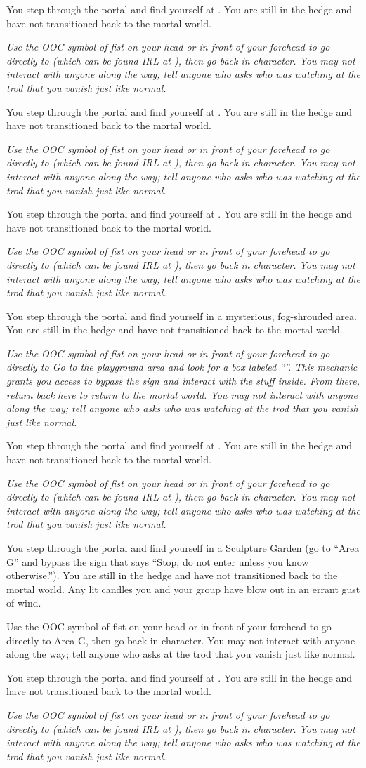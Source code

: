 \documentclass[white]{gl2018}
\begin{document}
\newcommand{\jumpto}[1]{You step through the portal and find yourself at #1{}. You are still in the hedge and have not transitioned back to the mortal world.

\textit{Use the OOC symbol of fist on your head or in front of your forehead to go directly to #1{} (which can be found IRL at #1{\MYwhere}), then go back in character. You may not interact with anyone along the way; tell anyone who asks who was watching at the trod that you vanish just like normal.}}
\begin{sect}{2}
\jumpto{\pAlbinoRedwoodWeekend}
\end{sect}
\begin{sect}{3}
\jumpto{\pReflectingPoolWeekend}
\end{sect}
\begin{sect}{4}
\jumpto{\pOutInTheForestWeekend}
\end{sect}
\begin{sect}{5}
You step through the portal and find yourself in a mysterious, fog-shrouded area.  You are still in the hedge and have not transitioned back to the mortal world.

\textit{Use the OOC symbol of fist on your head or in front of your forehead to go directly to Go to the playground area and look for a box labeled ``\sSculptureGardenWarning{}''.  This mechanic grants you access to bypass the sign and interact with the stuff inside.  From there, return back here to return to the mortal world.  You may not interact with anyone along the way; tell anyone who asks who was watching at the trod that you vanish just like normal.}
\end{sect}
\begin{sect}{6}
\jumpto{\pOldLectureHallWeekend}
\end{sect}
\begin{sect}{7}

You step through the portal and find yourself in a Sculpture Garden (go to “Area G” and bypass the sign that says “Stop, do not enter unless you know otherwise.”). You are still in the hedge and have not transitioned back to the mortal world. Any lit candles you and your group have blow out in an errant gust of wind.

Use the OOC symbol of fist on your head or in front of your forehead to go directly to Area G, then go back in character. You may not interact with anyone along the way; tell anyone who asks at the trod that you vanish just like normal.
\end{sect}
\begin{sect}{8}
\jumpto{\pOldLectureHallWeekend}
\end{sect}
\end{document}
